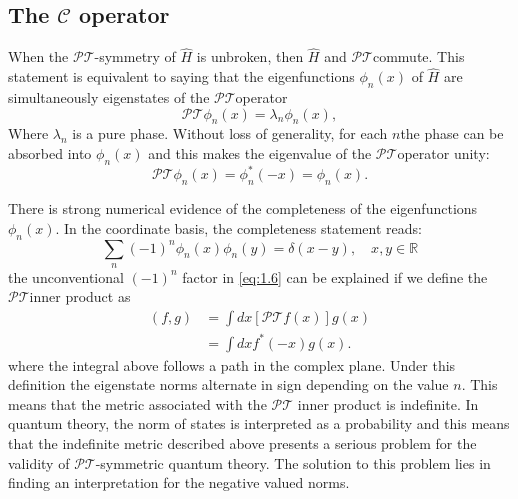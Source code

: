 \documentclass[12pt, a4paper]{report}
\newcommand\PT{\(\mathcal{PT}\)}
\begin{document}
\subsection{The $\mathcal{C}$ operator}\label{CC}
When the \PT-symmetry of $\hat{H}$ is unbroken, then $\hat{H}$ and \PT\:commute. This statement is equivalent to saying that the eigenfunctions $\phi_n(x)$ of $\hat{H}$ are simultaneously eigenstates of the \PT\:operator\cite{Bender_2004}
\begin{equation}\label{eq:1.4}
\mathcal{PT}\phi_n(x) = \lambda_n \phi_n(x),
\end{equation}
Where $\lambda_n$ is a pure phase. Without loss of generality, for each $n$\:the phase can be absorbed into $\phi_n(x)$ and this makes the eigenvalue of the \PT operator unity\cite{Bender_2004}: 
\begin{equation}\label{eq:1.5}
\mathcal{PT}\phi_n(x) = \phi_{n}^{*}(-x) = \phi_n(x).
\end{equation}

There is strong numerical evidence of the completeness of the eigenfunctions $\phi_n(x)$\cite{ComplexExtension}\cite{Bender_2004}\cite{Brody_2013}. In the coordinate basis, the completeness statement reads:
\begin{equation}\label{eq:1.6}
\sum_{n}(-1)^{n}\phi_n(x)\phi_n(y) = \delta(x-y),\quad x, y \in \mathbb{R}
\end{equation}
the unconventional $(-1)^n$ factor in \ref{eq:1.6} can be explained if we define the \PT\:inner product as
\begin{align}\label{eq:1.7}
\left ( f, g \right )  & = \int dx \left [ \mathcal{PT} f(x) \right ] g(x)\nonumber\\
                       & = \int dx f^{*}(-x) g(x).
\end{align}
where the integral above follows a path in the complex plane. Under this definition the eigenstate norms alternate in sign depending on the value $n$. This means that the metric associated with the \PT\: inner product is indefinite\cite{Bender_2004}\cite{Critique}.
In quantum theory, the norm of states is interpreted as a probability and this means that the indefinite metric described above presents a serious problem for the validity of \PT-symmetric quantum theory. The solution to this problem lies in finding an interpretation for the negative valued norms\cite{PTsymmetricQM}.
\end{document}

